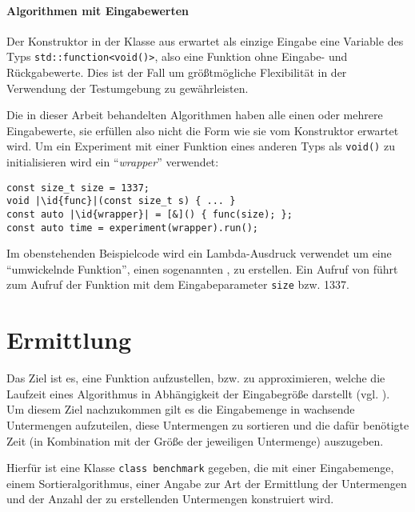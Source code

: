 \paragraph{Algorithmen mit Eingabewerten} Der Konstruktor in der Klasse aus  erwartet als einzige Eingabe eine Variable des Typs \lstinline{std::function<void()>}, also eine Funktion ohne Eingabe- und Rückgabewerte. Dies ist der Fall um größtmögliche Flexibilität in der Verwendung der Testumgebung zu gewährleisten.

Die in dieser Arbeit behandelten Algorithmen haben alle einen oder mehrere Eingabewerte, sie erfüllen also nicht die Form wie sie vom Konstruktor erwartet wird. Um ein Experiment mit einer Funktion eines anderen Typs als \lstinline{void()} zu initialisieren wird ein \enquote{\emph{wrapper}} verwendet:

\begin{lstlisting}[numbers=none]
const size_t size = 1337;
void |\id{func}|(const size_t s) { ... }
const auto |\id{wrapper}| = [&]() { func(size); };
const auto time = experiment(wrapper).run();
\end{lstlisting}

Im obenstehenden Beispielcode wird ein Lambda-Ausdruck verwendet um eine \enquote{umwickelnde Funktion}, einen sogenannten , zu erstellen. Ein Aufruf von  führt zum Aufruf der Funktion  mit dem Eingabeparameter \lstinline{size} bzw. 1337.

\section{Ermittlung}
\label{sec:funkterm}

Das Ziel ist es, eine Funktion aufzustellen, bzw. zu approximieren, welche die Laufzeit eines Algorithmus in Abhängigkeit der Eingabegröße darstellt (vgl. \cite[37]{mcg2012}). Um diesem Ziel nachzukommen gilt es die Eingabemenge in wachsende Untermengen aufzuteilen, diese Untermengen zu sortieren und die dafür benötigte Zeit (in Kombination mit der Größe der jeweiligen Untermenge) auszugeben.

Hierfür ist eine Klasse \lstinline{class benchmark} gegeben, die mit einer Eingabemenge, einem Sortieralgorithmus, einer Angabe zur Art der Ermittlung der Untermengen und der Anzahl der zu erstellenden Untermengen konstruiert wird.

